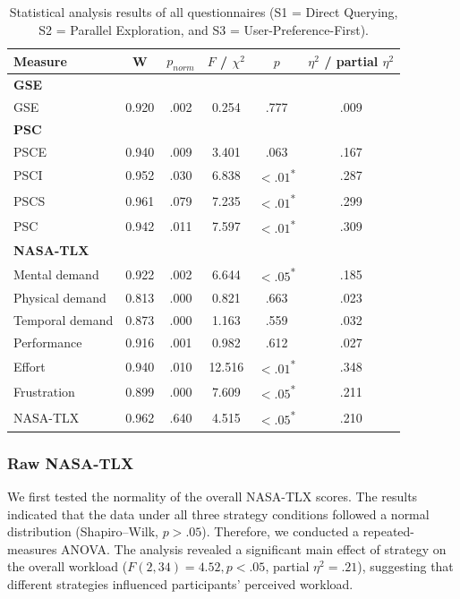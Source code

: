 \documentclass[sigconf,authordraft]{acmart}
\begin{document}
\begin{table}[ht]
\centering
\caption{Statistical analysis results of all questionnaires (S1 = Direct Querying, S2 = Parallel Exploration, and S3 = User-Preference-First).}
\begin{tabular}{lccccc}
\hline
Measure & W & $p_{norm}$ & $F$ / $\chi^2$ & $p$ & $\eta^2$ / partial $\eta^2$ \\
\hline
\textbf{GSE} & & & & & \\
GSE & 0.920 & .002 & 0.254 & .777 & .009 \\
\hline
\textbf{PSC} & & & & & \\
PSCE        & 0.940 & .009 & 3.401  & .063 & .167 \\
PSCI        & 0.952 & .030 & 6.838  & $<.01$\textsuperscript{*} & .287 \\
PSCS        & 0.961 & .079 & 7.235  & $<.01$\textsuperscript{*} & .299 \\
PSC         & 0.942 & .011 & 7.597  & $<.01$\textsuperscript{*} & .309 \\
\hline
\textbf{NASA-TLX} & & & & & \\
Mental demand   & 0.922 & .002 & 6.644  & $<.05$\textsuperscript{*} & .185 \\
Physical demand & 0.813 & .000 & 0.821  & .663 & .023 \\
Temporal demand & 0.873 & .000 & 1.163  & .559 & .032 \\
Performance     & 0.916 & .001 & 0.982  & .612 & .027 \\
Effort          & 0.940 & .010 & 12.516 & $<.01$\textsuperscript{*} & .348 \\
Frustration     & 0.899 & .000 & 7.609  & $<.05$\textsuperscript{*} & .211 \\
NASA-TLX        & 0.962 & .640 & 4.515  & $<.05$\textsuperscript{*} & .210 \\
\hline
\end{tabular}
\end{table}

\subsubsection{Raw NASA-TLX}
We first tested the normality of the overall NASA-TLX scores. The results indicated that the data under all three strategy conditions followed a normal distribution (Shapiro–Wilk, $p > .05$). Therefore, we conducted a repeated-measures ANOVA. The analysis revealed a significant main effect of strategy on the overall workload ($F(2,34) = 4.52, p < .05$, partial $\eta^2 = .21$), suggesting that different strategies influenced participants’ perceived workload.
\end{document}
